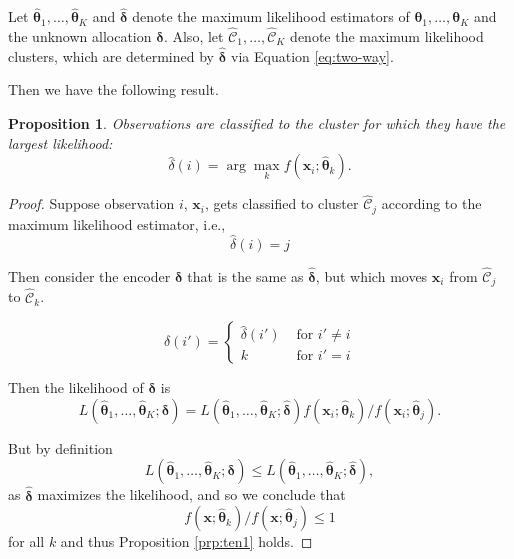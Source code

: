 \documentclass[
]{book}
\newtheorem{proposition}{Proposition}[chapter]
\theoremstyle{definition}
\theoremstyle{definition}
\theoremstyle{definition}
\theoremstyle{definition}
\theoremstyle{remark}
\begin{document}
Let \(\hat{\boldsymbol \theta}_1, \ldots , \hat{\boldsymbol \theta}_K\) and \(\hat{\boldsymbol \delta}\) denote the maximum likelihood estimators of \(\boldsymbol \theta_1, \ldots , \boldsymbol \theta_K\) and the unknown allocation \(\boldsymbol \delta\).
Also, let \(\hat{\mathcal{C}}_1, \ldots, \hat{\mathcal{C}}_K\) denote the maximum likelihood clusters, which are determined by \(\hat{\boldsymbol \delta}\) via Equation \eqref{eq:two-way}.

Then we have the following result.

\begin{proposition}
\protect\hypertarget{prp:ten1}{}{\label{prp:ten1} }Observations are classified to the cluster for which they have the largest likelihood:
\[\hat{\delta}(i)= \arg \max_k f(\mathbf x_i; \hat{\boldsymbol \theta}_k).\]
\end{proposition}

\begin{proof}
Suppose observation \(i\), \(\mathbf x_i\), gets classified to cluster \(\hat{\mathcal{C}}_j\) according to the maximum likelihood estimator, i.e.,
\[\hat{\delta}(i)=j\]

Then consider the encoder \(\boldsymbol \delta\) that is the same as \(\hat{\boldsymbol \delta}\), but which moves \(\mathbf x_i\) from \(\hat{\mathcal{C}}_j\) to \(\hat{\mathcal{C}}_k\).

\[\delta(i') =\begin{cases}
\hat{\delta}(i') &\mbox{ for } i' \not = i\\
 k & \mbox{ for } i' = i
\end{cases}\]

Then the likelihood of \(\boldsymbol \delta\) is
\[
L(\hat{\boldsymbol \theta}_1, \ldots , \hat{\boldsymbol \theta}_K; \boldsymbol \delta) = L(\hat{\boldsymbol \theta}_1, \ldots , \hat{\boldsymbol \theta}_K; \hat{\boldsymbol \delta})f(\mathbf x_i; \hat{\boldsymbol \theta}_k)/f(\mathbf x_i; \hat{\boldsymbol \theta}_j).
\]

But by definition
\[
L(\hat{\boldsymbol \theta}_1, \ldots , \hat{\boldsymbol \theta}_K; \boldsymbol \delta) \leq L(\hat{\boldsymbol \theta}_1, \ldots , \hat{\boldsymbol \theta}_K; \hat{\boldsymbol \delta}),
\]
as \(\hat{\boldsymbol \delta}\) maximizes the likelihood, and so we conclude that
\[f(\mathbf x; \hat{\boldsymbol \theta}_k)/f(\mathbf x; \hat{\boldsymbol \theta}_j)\leq1\]
for all \(k\)
and thus Proposition \ref{prp:ten1} holds.
\end{proof}
\end{document}
